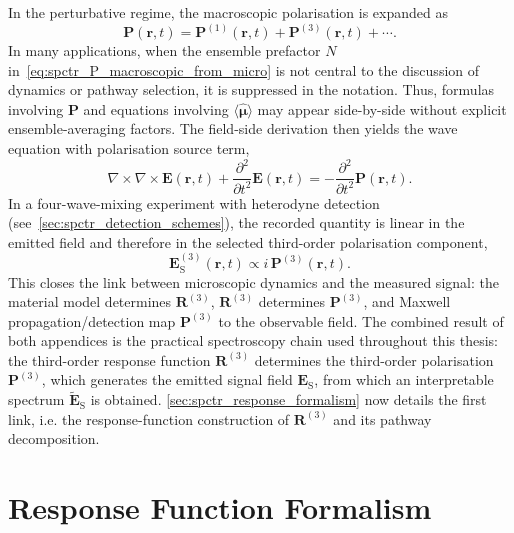 In the perturbative regime, the macroscopic polarisation is expanded as
\begin{equation*}
\boldsymbol{P}(\boldsymbol{r},t)
=\boldsymbol{P}^{(1)}(\boldsymbol{r},t)
+\boldsymbol{P}^{(3)}(\boldsymbol{r},t)+\cdots.
\end{equation*}
In many applications, when the ensemble prefactor $N$ in~\autoref{eq:spctr_P_macroscopic_from_micro} is not central to the discussion of dynamics or pathway selection, it is suppressed in the notation.
Thus, formulas involving $\boldsymbol{P}$ and equations involving $\langle\hat{\boldsymbol{\mu}}\rangle$ may appear side-by-side without explicit ensemble-averaging factors.
The field-side derivation then yields the wave equation with polarisation source term,
\begin{equation*}
	\nabla \times \nabla \times \boldsymbol{E}(\boldsymbol{r}, t)
	+ \frac{\partial^2}{\partial t^2}
	\boldsymbol{E}(\boldsymbol{r}, t)
	= - \frac{\partial^2}{\partial t^2}
	\boldsymbol{P}(\boldsymbol{r}, t).
\end{equation*}
In a four-wave-mixing experiment with heterodyne detection (see~\autoref{sec:spctr_detection_schemes}), the recorded quantity is linear in the emitted field and therefore in the selected third-order polarisation component,
\begin{equation}
	\boldsymbol{E}_{\mathrm{S}}^{(3)}(\boldsymbol{r},t)
	\propto
	i\,\boldsymbol{P}^{(3)}(\boldsymbol{r},t).
	\label{eq:spctr_signal_field_from_polarisation}
\end{equation}
This closes the link between microscopic dynamics and the measured signal: the material model determines $\boldsymbol{R}^{(3)}$, $\boldsymbol{R}^{(3)}$ determines $\boldsymbol{P}^{(3)}$, and Maxwell propagation/detection map $\boldsymbol{P}^{(3)}$ to the observable field.
The combined result of both appendices is the practical spectroscopy chain used throughout this thesis: the third-order response function $\boldsymbol{R}^{(3)}$ determines the third-order polarisation $\boldsymbol{P}^{(3)}$, which generates the emitted signal field $\boldsymbol{E}_{\mathrm{S}}$, from which an interpretable spectrum $\tilde{\boldsymbol{E}}_{\mathrm{S}}$ is obtained.
\autoref{sec:spctr_response_formalism} now details the first link, i.e.
the response-function construction of $\boldsymbol{R}^{(3)}$ and its pathway decomposition.

\section{Response Function Formalism}
\label{sec:spctr_response_formalism}

